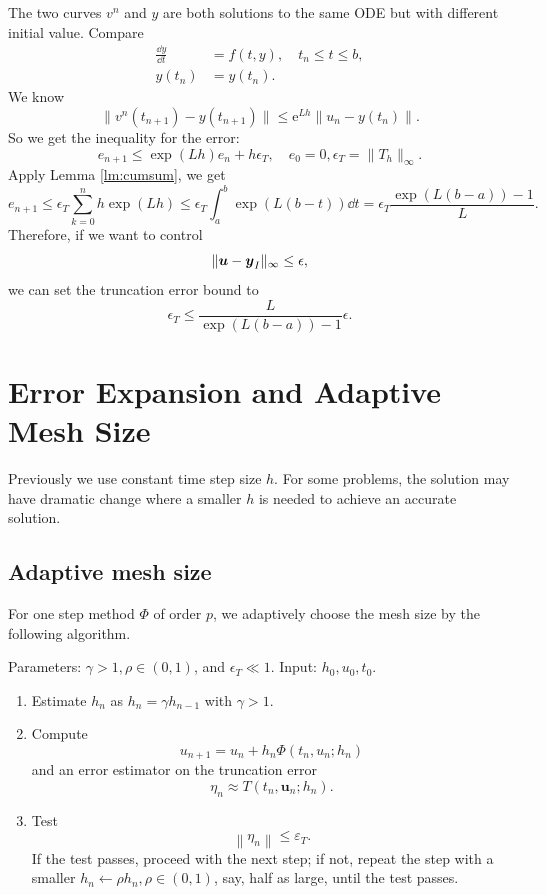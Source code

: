 \documentclass[10pt]{amsart}
\begin{document}
The two curves $v^n$ and $y$ are both solutions to the same ODE but with different initial value. Compare 
\begin{equation}
\begin{aligned}
\frac{\dd y}{\dd t} &= f(t, y), \quad t_n \leq t \leq b, \\
y(t_n) &= y(t_n).
\end{aligned}
\end{equation}
We know
$$
\|v^n(t_{n+1}) - y(t_{n+1})\| \leq \mathrm{e}^{Lh}\left\|u_n - y(t_n)\right\|.
$$
So we get the inequality for the error:
$$
e_{n+1}\leq \exp(Lh) e_n + h \epsilon_T,  \quad e_0 = 0, \epsilon_T = \|T_h\|_{\infty}.
$$
Apply Lemma \ref{lm:cumsum}, we get
$$
e_{n+1}\leq \epsilon_T \sum_{k=0}^n h \exp(Lh)\leq \epsilon_T \int_a^b \exp (L(b-t))\dd t = \epsilon_T \frac{ \exp (L(b-a))-1}{L}.
$$
Therefore, if we want to control 
$$
\| \boldsymbol u - \boldsymbol y_I\|_{\infty} \leq \epsilon,
$$
we can set the truncation error bound to 
\begin{equation}
 \epsilon_T \leq \frac{L}{ \exp (L(b-a))-1} \epsilon.
\end{equation}



\section{Error Expansion and Adaptive Mesh Size}
Previously we use constant time step size $h$. For some problems, the solution may have dramatic change where a smaller $h$ is needed to achieve an accurate solution.
\subsection{Adaptive mesh size}
For one step method $\Phi$ of order $p$, we adaptively choose the mesh size by the following algorithm.

Parameters: $\gamma >1, \rho \in (0,1)$, and $\epsilon_T \ll 1$. Input: $h_0, u_0, t_0$. 
\begin{enumerate}
 \item Estimate $h_n$ as $h_n = \gamma h_{n-1}$ with $\gamma > 1$.
\item Compute 
$$
u_{n+1} = {u}_n+h_n {\Phi}\left(t_n, {u}_n ; h_n\right)$$ and an error estimator on the truncation error 
$$
\eta_n \approx T\left(t_n, \boldsymbol{u}_n ; h_n\right).
$$
\item Test $$\left\| \eta_n \right\| \leq \varepsilon_T.$$ If the test passes, proceed with the next step; if not, repeat the step with a smaller $h_n \leftarrow \rho h_n, \rho \in (0,1)$, say, half as large, until the test passes.
\end{enumerate}
\end{document}
